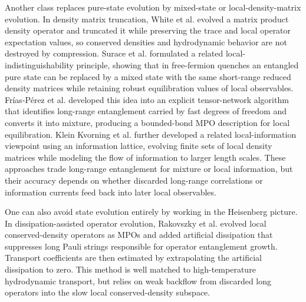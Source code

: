\documentclass[12pt]{article}
\begin{document}
Another class replaces pure-state evolution by mixed-state or local-density-matrix evolution. In density matrix truncation, White et al. \cite{whiteQuantumDynamicsThermalizing2018} evolved a matrix product density operator and truncated it while preserving the trace and local operator expectation values, so conserved densities and hydrodynamic behavior are not destroyed by compression. 
Surace et al. \cite{suraceSimulatingOutofequilibriumDynamics2019} formulated a related local-indistinguishability principle, showing that in free-fermion quenches an entangled pure state can be replaced by a mixed state with the same short-range reduced density matrices while retaining robust equilibration values of local observables. 
Frías-Pérez et al. \cite{frias-perezConvertingLongRangeEntanglement2024a} developed this idea into an explicit tensor-network algorithm that identifies long-range entanglement carried by fast degrees of freedom and converts it into mixture, producing a bounded-bond MPO description for local equilibration. 
Klein Kvorning et al. \cite{kleinkvorningTimeevolutionLocalInformation2022} further developed a related local-information viewpoint using an information lattice, evolving finite sets of local density matrices while modeling the flow of information to larger length scales. These approaches trade long-range entanglement for mixture or local information, but their accuracy depends on whether discarded long-range correlations or information currents feed back into later local observables.

One can also avoid state evolution entirely by working in the Heisenberg picture. In dissipation-assisted operator evolution, Rakovszky et al. \cite{rakovszkyDissipationassistedOperatorEvolution2022a} evolved local conserved-density operators as MPOs and added artificial dissipation that suppresses long Pauli strings responsible for operator entanglement growth. Transport coefficients are then estimated by extrapolating the artificial dissipation to zero. This method is well matched to high-temperature hydrodynamic transport, but relies on weak backflow from discarded long operators into the slow local conserved-density subspace.
\end{document}
